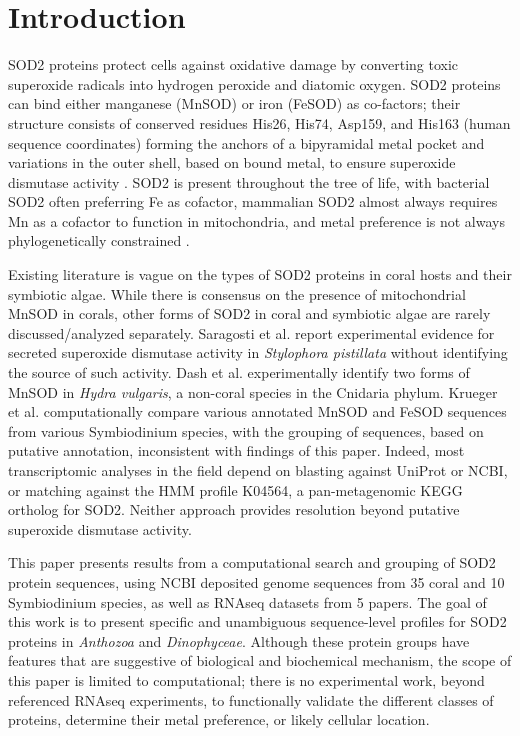 
\section*{Introduction}

SOD2 proteins protect cells against oxidative damage by converting toxic
superoxide radicals into hydrogen peroxide and diatomic oxygen. SOD2 proteins
can bind either manganese (MnSOD) or iron (FeSOD) as co-factors; their
structure consists of conserved residues His26, His74, Asp159, and His163
(human sequence coordinates) forming the anchors of a bipyramidal metal pocket
and variations in the outer shell, based on bound metal, to ensure superoxide
dismutase activity \cite{perry2010bbapap}. SOD2 is present throughout the tree
of life, with bacterial SOD2 often preferring Fe as cofactor, mammalian SOD2
almost always requires Mn as a cofactor to function in mitochondria, and metal
preference is not always phylogenetically constrained \cite{sendra2023nee}.

Existing literature is vague on the types of SOD2 proteins in coral hosts and
their symbiotic algae. While there is consensus on the presence of
mitochondrial MnSOD in corals, other forms of SOD2 in coral and symbiotic algae
are rarely discussed/analyzed separately. Saragosti et al.
\cite{saragosti2010plosone} report experimental evidence for secreted
superoxide dismutase activity in \textit{Stylophora pistillata} without
identifying the source of such activity.  Dash et al. \cite{dash2007gene}
experimentally identify two forms of MnSOD in \textit{Hydra vulgaris}, a
non-coral species in the Cnidaria phylum.  Krueger et al. \cite{krueger2015eb}
computationally compare various annotated MnSOD and FeSOD sequences from
various Symbiodinium species, with the grouping of sequences, based on putative
annotation, inconsistent with findings of this paper. Indeed, most
transcriptomic analyses in the field depend on blasting against UniProt or
NCBI, or matching against the HMM profile K04564, a pan-metagenomic KEGG
ortholog \cite{kegg} for SOD2. Neither approach provides resolution beyond
putative superoxide dismutase activity.

This paper presents results from a computational search and grouping of SOD2
protein sequences, using NCBI deposited genome sequences from 35 coral and 10
Symbiodinium species, as well as RNAseq datasets from 5 papers. The goal of
this work is to present specific and unambiguous sequence-level profiles for
SOD2 proteins in \textit{Anthozoa} and \textit{Dinophyceae}. Although these
protein groups have features that are suggestive of biological and biochemical
mechanism, the scope of this paper is limited to computational; there is no
experimental work, beyond referenced RNAseq experiments, to functionally
validate the different classes of proteins, determine their metal preference,
or likely cellular location.

